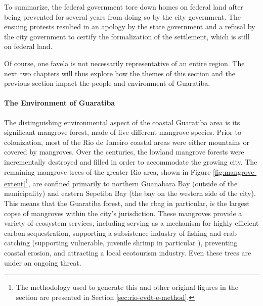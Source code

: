 To summarize, the federal government tore down homes on federal land after being prevented for several years from doing so by the city government. The ensuing protests resulted in an apology by the state government and a refusal by the city government to certify the formalization of the settlement, which is still on federal land.

Of course, one favela is not necessarily representative of an entire region. The next two chapters will thus explore how the themes of this section and the previous section impact the people and environment of Guaratiba.

\paragraph{The Environment of Guaratiba} \leavevmode\newline \label{sec:guaratiba-environment}

The distinguishing environmental aspect of the coastal Guaratiba area is its significant mangrove forest, made of five different mangrove species. Prior to colonization, most of the Rio de Janeiro coastal areas were either mountains or covered by mangroves. Over the centuries, the lowland mangrove forests were incrementally destroyed and filled in order to accommodate the growing city. The remaining mangrove trees of the greater Rio area, shown in Figure \ref{fig:mangrove-extent}\footnote{The methodology used to generate this and other original figures in the section are presented in Section \ref{sec:rio-evdt-e-method}.}, are confined primarily to northern Guanabara Bay (outside of the municipality) and eastern Sepetiba Bay (the bay on the western side of the city). This means that the Guaratiba forest, and the \ac{rbag} in particular, is the largest copse of mangroves within the city’s jurisdiction. These mangroves provide a variety of ecosystem services, including serving as a mechanism for highly efficient carbon sequestration, supporting a subsistence industry of fishing and crab catching (supporting vulnerable, juvenile shrimp in particular \cite{costaPensarMarPara1992}), preventing coastal erosion, and attracting a local ecotourism industry. Even these trees are under an ongoing threat.

